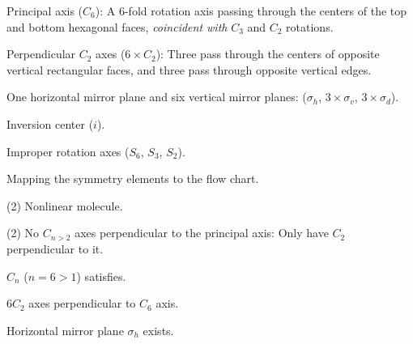 \begin{solution}
\begin{enumext}
\begin{enumext}
\begin{enumext}[label = \arabic*.]
        \item Principal axis ($C_6$): A $6$-fold rotation axis passing through
        the centers of the top and bottom hexagonal faces,
        \emph{coincident with} $C_3$ and $C_2$ rotations.
        \item Perpendicular $C_2$ axes ($6 \times C_2$): Three pass through
        the centers of opposite vertical rectangular faces, and three pass
        through opposite vertical edges.
        \item One horizontal mirror plane and six vertical mirror planes:
        ($\sigma_h$, $3 \times \sigma_v$, $3 \times \sigma_d$).
        \item Inversion center ($i$).
        \item Improper rotation axes ($S_6$, $S_3$, $S_2$).
      \end{enumext}
      \item Mapping the symmetry elements to the flow chart.
      \begin{enumext*}[label = \arabic*., columns = 2]
        \item(2) Nonlinear molecule.
        \item(2) No $C_{n>2}$ axes perpendicular to the principal axis:
        Only have $C_2$ perpendicular to it.
        \item $C_n$ ($n = 6 > 1$) satisfies.
        \item $6C_2$ axes perpendicular to $C_6$ axis.
        \item Horizontal mirror plane $\sigma_h$ exists.
      \end{enumext*}
      \begin{center}
      \end{center}
    \end{enumext}
  \end{enumext}
\end{solution}

